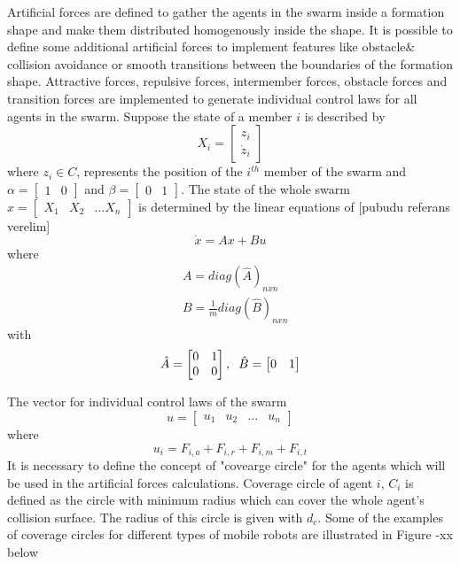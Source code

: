 \documentclass[twoside]{article}
\begin{document}
			Artificial forces are defined to gather the agents in the swarm inside a formation shape and make them distributed homogenously inside the shape. It is possible to define some additional artificial forces to implement features like obstacle$\&$collision avoidance or smooth transitions between the boundaries of the formation shape. Attractive forces, repulsive forces, intermember forces, obstacle forces and transition forces are implemented to generate individual control laws for all agents in the swarm. Suppose the state of a member $i$ is described by
			\begin{equation}
X_i = \begin{bmatrix}
z_i\\ \dot{z}_i
\end{bmatrix}
			\end{equation}
			where  $z_i \in C$, represents the position of the $i^{th}$ member of the swarm and $\alpha = \begin{bmatrix}
1 & 0
			\end{bmatrix}$ and $\beta = \begin{bmatrix}
0 & 1
			\end{bmatrix}$. The state of the whole swarm $x= \begin{bmatrix}
X_1 & X_2 & ... X_n
			\end{bmatrix}$ is determined by the linear equations of [pubudu referans verelim]
			\begin{equation}
\dot{x} = Ax + Bu
			\end{equation}
			where
			\begin{align*}
&A = diag\left(\hat{A}\right)_{nxn}\\
&B = \frac{1}{m} diag\left(\hat{B}\right)_{nxn}
			\end{align*}
			with
			\begin{equation}
\hat{A} = \begin{bmatrix}
0&1\\0&0
\end{bmatrix} , \hspace{0.2cm} \hat{B} = \begin{bmatrix}
0&1
\end{bmatrix}
			\end{equation}
			
			The vector for individual control laws of the swarm
			\begin{equation}
u = \begin{bmatrix}
u_1 & u_2 & ... & u_n
\end{bmatrix}
			\end{equation}
			where
			\begin{equation}
u_i = F_{i,a} + F_{i,r} + F_{i,m} + F_{i,t}
			\end{equation}
		It is necessary to define the concept of "covearge circle"	for the agents which will be used in the artificial forces calculations. Coverage circle of agent $i$, $C_i$ is defined as the circle with minimum radius which can cover the whole agent's collision surface. The radius of this circle is given with $d_c$. Some of the examples of coverage circles for different types of mobile robots are illustrated in Figure -xx below
		
\end{document}
